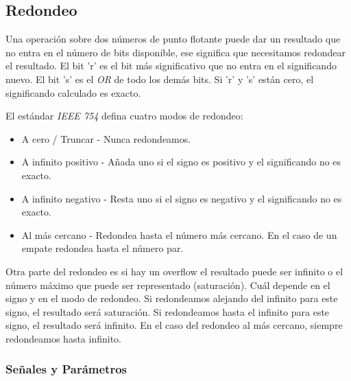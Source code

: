 \documentclass[a4paper]{article}
\begin{document}
\subsection{Redondeo}

Una operación sobre dos números de punto flotante puede dar un resultado que no entra en el número de bits disponible, ese significa que necesitamos redondear el resultado. El bit 'r' es el bit más significativo que no entra en el significando nuevo. El bit 's' es el \textit{OR} de todo los demás bits. Si 'r' y 's' están cero, el significando calculado es exacto.

El estándar \textit{IEEE 754} defina cuatro modos de redondeo:
\begin{itemize}[noitemsep]
\item A cero / Truncar - Nunca redondeamos.
\item A infinito positivo - Añada uno si el signo es positivo y el significando no es exacto.
\item A infinito negativo - Resta uno si el signo es negativo y el significando no es exacto.
\item Al más cercano - Redondea hasta el número más cercano. En el caso de un empate redondea hasta el número par.
\end{itemize}

Otra parte del redondeo es si hay un overflow el resultado puede ser infinito o el número máximo que puede ser representado (saturación). Cuál depende en el signo y en el modo de redondeo. Si redondeamos alejando del infinito para este signo, el resultado será saturación. Si redondeamos hasta el infinito para este signo, el resultado será infinito. En el caso del redondeo al más cercano, siempre redondeamos hasta infinito.

\subsubsection{Señales y Parámetros}
\end{document}
